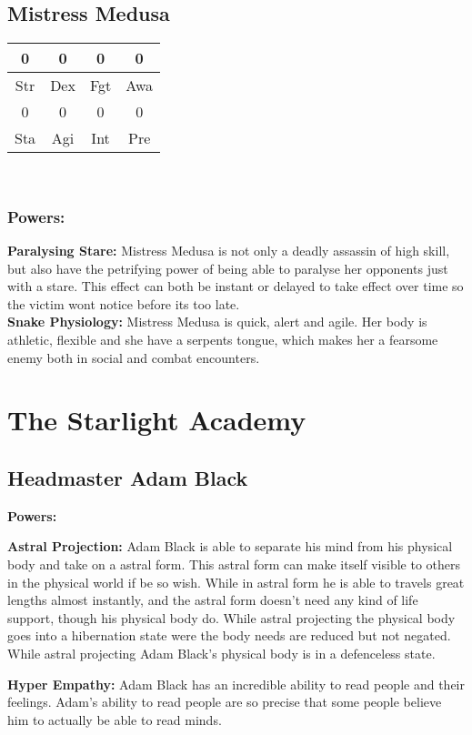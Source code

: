 \subsection{Mistress Medusa}

\begin{tabular}{|c|c|c|c|}
\hline 
0 & 0 & 0 & 0 \\ 
\hline 
Str & Dex & Fgt & Awa \\ 
\hline 
0 & 0 & 0 & 0 \\ 
\hline 
Sta & Agi & Int & Pre \\ 
\hline 
\end{tabular} \\

\subsubsection{Powers:}

\textbf{Paralysing Stare:}
Mistress Medusa is not only a deadly assassin of high skill, but also have the petrifying power of being able to paralyse her opponents just with a stare. This effect can both be instant or delayed to take effect over time so the victim wont notice before its too late.\\

\textbf{Snake Physiology:}
Mistress Medusa is quick, alert and agile. Her body is athletic, flexible and she have a serpents tongue, which makes her a fearsome enemy both in social and combat encounters.\\

\section{The Starlight Academy}
\subsection{Headmaster Adam Black}
\textbf{Powers:}

\textbf{Astral Projection:}
Adam Black is able to separate his mind from his physical body and take on a astral form. This astral form can make itself visible to others in the physical world if be so wish. While in astral form he is able to travels great lengths almost instantly, and the astral form doesn't need any kind of life support, though his physical body do. While astral projecting the physical body goes into a hibernation state were the body needs are reduced but not negated. While astral projecting Adam Black's physical body is in a defenceless state.

\textbf{Hyper Empathy:}
Adam Black has an incredible ability to read people and their feelings. Adam's ability to read people are so precise that some people believe him to actually be able to read minds.